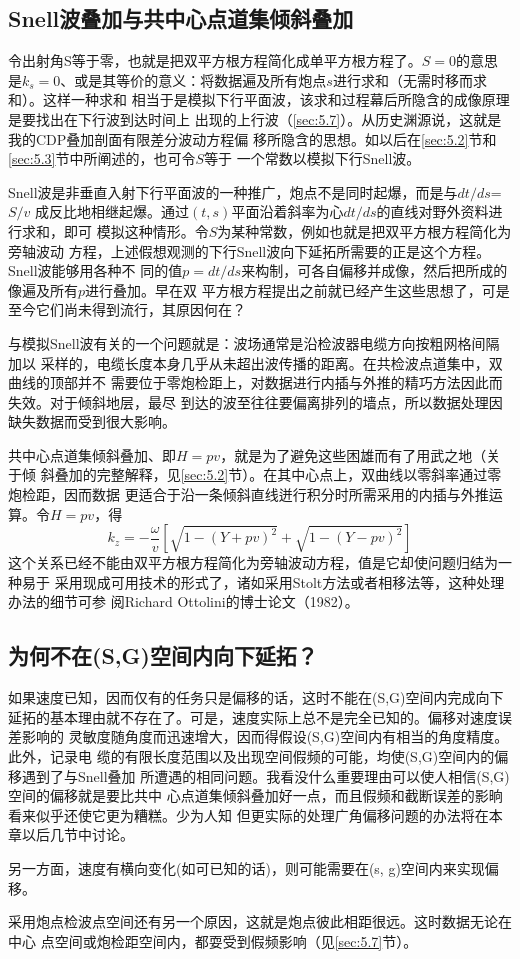 \subsection{Snell波叠加与共中心点道集倾斜叠加}
\label{sec:3.4.6}

令出射角S等于零，也就是把双平方根方程简化成单平方根方程了。$S=0$的意思是$k_s =
0$、或是其等价的意义：将数据遍及所有炮点$s$进行求和（无需时移而求和）。这样一种求和
相当于是模拟下行平面波，该求和过程幕后所隐含的成像原理是要找出在下行波到达时间上
出现的上行波（\ref{sec:5.7}）。从历史渊源说，这就是我的CDP叠加剖面有限差分波动方程偏
移所隐含的思想。如以后在\ref{sec:5.2}节和\ref{sec:5.3}节中所阐述的，也可令$S$等于
一个常数以模拟下行Snell波。

Snell波是非垂直入射下行平面波的一种推广，炮点不是同时起爆，而是与$dt/ds$=$S/v$
成反比地相继起爆。通过$(t,s)$平面沿着斜率为心$dt/ds$的直线对野外资料进行求和，即可
模拟这种情形。令$S$为某种常数，例如也就是把双平方根方程简化为旁轴波动
方程，上述假想观测的下行Snell波向下延拓所需要的正是这个方程。Snell波能够用各种不
同的值$p=dt/ds$来构制，可各自偏移并成像，然后把所成的像遍及所有$p$进行叠加。早在双
平方根方程提出之前就已经产生这些思想了，可是至今它们尚未得到流行，其原因何在？

与模拟Snell波有关的一个问题就是：波场通常是沿检波器电缆方向按粗网格间隔加以
采样的，电缆长度本身几乎从未超出波传播的距离。在共检波点道集中，双曲线的顶部并不
需要位于零炮检距上，对数据进行内插与外推的精巧方法因此而失效。对于倾斜地层，最尽
到达的波至往往要偏离排列的墙点，所以数据处理因缺失数据而受到很大影响。

共中心点道集倾斜叠加、即$H=pv$，就是为了避免这些困雄而有了用武之地（关于倾
斜叠加的完整解释，见\ref{sec:5.2}节）。在其中心点上，双曲线以零斜率通过零炮检距，因而数据
更适合于沿一条倾斜直线迸行积分时所需采用的内插与外推运算。令$H=pv$，得
\begin{equation}
k_z=-\frac{\omega}{v}[\sqrt{1-(Y+pv)^2}+\sqrt{1-(Y-pv)^2}]
\label{eq:ex3.4.10}
\end{equation}
这个关系已经不能由双平方根方程简化为旁轴波动方程，值是它却使问题归结为一种易于
采用现成可用技术的形式了，诸如采用Stolt方法或者相移法等，这种处理办法的细节可参
阅Richard Ottolini的博士论文（1982）。

\subsection{为何不在(S,G)空间内向下延拓？}
\label{sec:3.4.7}

如果速度已知，因而仅有的任务只是偏移的话，这时不能在(S,G)空间内完成向下
延拓的基本理由就不存在了。可是，速度实际上总不是完全已知的。偏移对速度误差影响的
灵敏度随角度而迅速增大，因而得假设(S,G)空间内有相当的角度精度。此外，记录电
缆的有限长度范围以及出现空间假频的可能，均使(S,G)空间内的偏移遇到了与Snell叠加
所遭遇的相同问题。我看没什么重要理由可以使人相信(S,G)空间的偏移就是要比共中
心点道集倾斜叠加好一点，而且假频和截断误差的影晌看来似乎还使它更为糟糕。少为人知
但更实际的处理广角偏移问题的办法将在本章以后几节中讨论。

另一方面，速度有横向变化(如可已知的话)，则可能需要在(s,
g)空间内来实现偏移。

采用炮点检波点空间还有另一个原因，这就是炮点彼此相距很远。这时数据无论在中心
点空间或炮检距空间内，都耍受到假频影响（见\ref{sec:5.7}节）。
